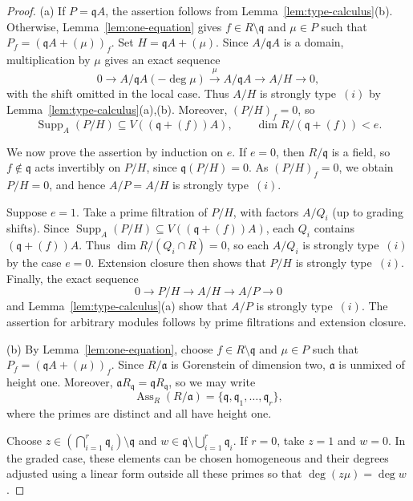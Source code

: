 \documentclass[11pt,letterpaper]{amsart}
\theoremstyle{plain}
\theoremstyle{definition}
\theoremstyle{remark}
\begin{document}
\begin{proof}
(a) If $P=\mathfrak qA$, the assertion follows from
Lemma~\ref{lem:type-calculus}(b). Otherwise,
Lemma~\ref{lem:one-equation} gives $f\in R\setminus\mathfrak q$
and $\mu\in P$ such that
$P_f=(\mathfrak qA+(\mu))_f$. Set $H=\mathfrak qA+(\mu)$.
Since $A/\mathfrak qA$ is a domain, multiplication by $\mu$
gives an exact sequence
\[
0\longrightarrow A/\mathfrak qA(-\deg\mu)
\xrightarrow{\ \mu\ } A/\mathfrak qA
\longrightarrow A/H\longrightarrow0,
\]
with the shift omitted in the local case. Thus $A/H$ is
strongly type~$(i)$ by Lemma~\ref{lem:type-calculus}(a),(b).
Moreover, $(P/H)_f=0$, so
\[
\operatorname{Supp}_A(P/H)
\subseteq V((\mathfrak q+(f))A),
\qquad
\dim R/(\mathfrak q+(f))<e.
\]

We now prove the assertion by induction on $e$.
If $e=0$, then $R/\mathfrak q$ is a field, so
$f\notin\mathfrak q$ acts invertibly on $P/H$, since
$\mathfrak q(P/H)=0$. As $(P/H)_f=0$, we obtain
$P/H=0$, and hence $A/P=A/H$ is strongly type~$(i)$.

Suppose $e=1$. Take a prime filtration of $P/H$,
with factors $A/Q_i$ (up to grading shifts).
Since $\operatorname{Supp}_A(P/H)\subseteq
V((\mathfrak q+(f))A)$, each $Q_i$ contains
$(\mathfrak q+(f))A$. Thus
$\dim R/(Q_i\cap R)=0$, so each $A/Q_i$ is strongly
type~$(i)$ by the case $e=0$. Extension closure
then shows that $P/H$ is strongly type~$(i)$.
Finally, the exact sequence
\[
0\longrightarrow P/H\longrightarrow A/H
\longrightarrow A/P\longrightarrow0
\]
and Lemma~\ref{lem:type-calculus}(a) show that
$A/P$ is strongly type~$(i)$.
The assertion for arbitrary modules follows by
prime filtrations and extension closure.


(b) By Lemma~\ref{lem:one-equation}, choose
$f\in R\setminus\mathfrak q$ and $\mu\in P$ such that
$P_f=(\mathfrak qA+(\mu))_f$.
Since $R/\mathfrak a$ is Gorenstein of dimension two,
$\mathfrak a$ is unmixed of height one. Moreover,
$\mathfrak aR_{\mathfrak q}=\mathfrak qR_{\mathfrak q}$,
so we may write
\[
\operatorname{Ass}_R(R/\mathfrak a)
=\{\mathfrak q,\mathfrak q_1,\ldots,\mathfrak q_r\},
\]
where the primes are distinct and all have height one.

Choose
$z\in(\bigcap_{i=1}^r\mathfrak q_i)\setminus\mathfrak q$
and $w\in\mathfrak q\setminus\bigcup_{i=1}^r\mathfrak q_i$.
If $r=0$, take $z=1$ and $w=0$.
In the graded case, these elements can be chosen
homogeneous and their degrees adjusted using a linear
form outside all these primes so that
$\deg(z\mu)=\deg w$.


\end{proof}
\end{document}
